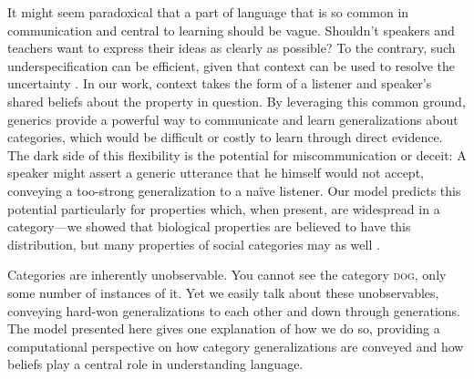 \documentclass[10pt,letterpaper]{article}
\begin{document}
It might seem paradoxical that a part of language that is so common in communication and central to learning should be vague. 
Shouldn't speakers and teachers want to express their ideas as clearly as possible?
To the contrary, such underspecification can be efficient, given that context can be used to resolve the uncertainty \cite{Piantadosi2012}.
In our work, context takes the form of a listener and speaker's shared beliefs about the property in question. 
By leveraging this common ground, generics provide a powerful way to communicate and learn generalizations about categories, which would be difficult or costly to learn through direct evidence.
The dark side of this flexibility is the potential for miscommunication or deceit: A speaker might assert a generic utterance that he himself would not accept, conveying a too-strong generalization to a na\"{i}ve listener.  
Our model predicts this potential particularly for properties which, when present, are widespread in a category---we showed that biological properties are believed to have this distribution, but many properties of social categories may as well \cite{Cimpian2011a, Cimpian2012b, Rhodes2012}.


Categories are inherently unobservable. 
You cannot see the category \textsc{dog}, only some number of instances of it.
Yet we easily talk about these unobservables, conveying hard-won generalizations to each other and down through generations.
The model presented here gives one explanation of how we do so, providing a computational perspective on how category generalizations are conveyed and how beliefs play a central role in understanding language.



%




\setlength{\bibleftmargin}{.125in}
\setlength{\bibindent}{-\bibleftmargin}


\end{document}

